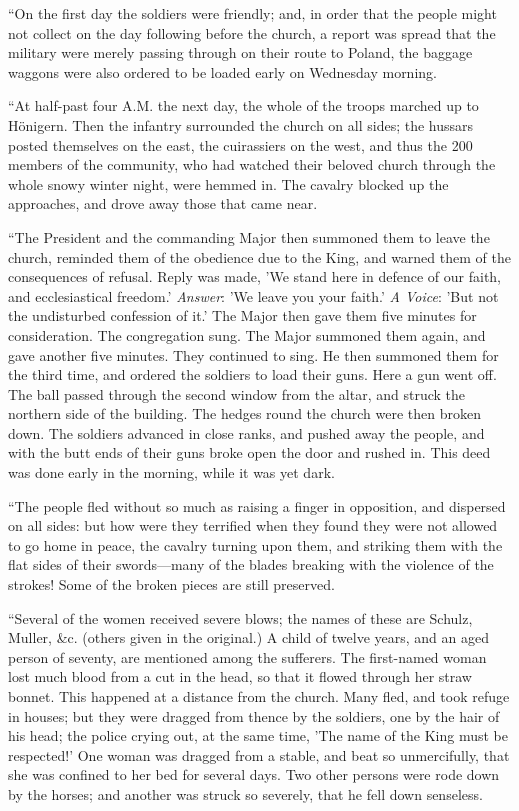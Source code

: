 ``On the first day the soldiers were
friendly; and, in order that the people might not collect on the day
following before the church, a report was
spread that the military were merely passing through on their route to
Poland, the baggage waggons were also ordered to be loaded early on
Wednesday morning.

``At half-past four A.M.
the next day, the whole of the troops marched up to Hönigern. Then the
infantry surrounded the church on all sides; the hussars posted
themselves on the east, the cuirassiers on the west, and thus the 200
members of the community, who had watched their beloved church through
the whole snowy winter night, were hemmed in. The cavalry blocked up the
approaches, and drove away those that came near.

``The President and the commanding
Major then summoned them to leave the church, reminded them of the
obedience due to the King, and warned them of the consequences of
refusal. Reply was made, 'We stand here in defence of our faith, and
ecclesiastical freedom.' \emph{Answer}: 'We leave you your faith.' \emph{A
Voice}: 'But not the undisturbed confession of it.' The Major then
gave them five minutes for consideration. The congregation sung. The
Major summoned them again, and gave another five minutes. They continued
to sing. He then summoned them for the third time, and ordered the
soldiers to load their guns. Here a gun went off. The ball passed
through the second window from the altar, and struck the northern side
of the building. The hedges round the church were then broken down. The
soldiers advanced in close ranks, and pushed away the people, and with
the butt ends of their guns broke open the door and rushed in. This deed
was done early in the morning, while it was yet dark.

``The people fled without so much as
raising a finger in opposition, and dispersed on all sides: but how were
they terrified when they found they were not allowed to go home in
peace, the cavalry turning upon them, and striking them with the flat
sides of their swords—many of the blades breaking with the violence of
the strokes! Some of the broken pieces are still preserved.

``Several of the women received
severe blows; the names of these are Schulz, Muller, \&c. (others
given in the original.) A child of twelve years, and an aged person of
seventy, are mentioned among the sufferers. The first-named woman lost
much blood from a cut in the head, so that it flowed through her straw
bonnet. This happened at a distance from the church. Many fled, and took
refuge in houses; but they were dragged from thence by the soldiers, one
by the hair of his head; the police crying out, at the same time, 'The
name of the King must be respected!' One woman was dragged from a
stable, and beat so unmercifully, that she was confined to her bed for
several days. Two other persons were rode down by the horses; and
another was struck so severely, that he fell down senseless.

